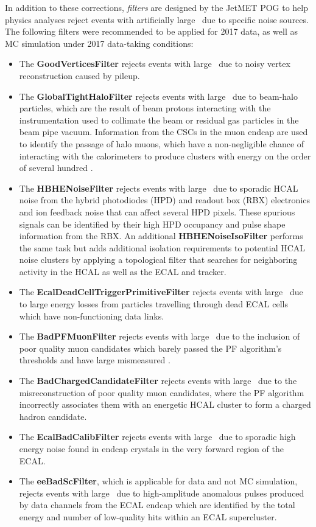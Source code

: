 In addition to these corrections, \textit{filters} are designed by the JetMET POG to help physics analyses reject events with artificially large \pTmiss\ due to specific noise sources. The following filters were recommended to be applied for 2017 data, as well as MC simulation under 2017 data-taking conditions:
\begin{itemize}
  \item The \textbf{GoodVerticesFilter} rejects events with large \pTmiss\ due to noisy vertex reconstruction caused by pileup. 
  \item The \textbf{GlobalTightHaloFilter} rejects events with large \pTmiss\ due to beam-halo particles, which are the result of beam protons interacting with the instrumentation used to collimate the beam or residual gas particles in the beam pipe vacuum. Information from the CSCs in the muon endcap are used to identify the passage of halo muons, which have a non-negligible chance of interacting with the calorimeters to produce clusters with energy on the order of several hundred \GeV.
  \item The \textbf{HBHENoiseFilter} rejects events with large \pTmiss\ due to sporadic HCAL noise from the hybrid photodiodes (HPD) and readout box (RBX) electronics and ion feedback noise that can affect several HPD pixels. These spurious signals can be identified by their high HPD occupancy and pulse shape information from the RBX. An additional \textbf{HBHENoiseIsoFilter} performs the same task but adds additional isolation requirements to potential HCAL noise clusters by applying a topological filter that searches for neighboring activity in the HCAL as well as the ECAL and tracker.
  \item The \textbf{EcalDeadCellTriggerPrimitiveFilter} rejects events with large \pTmiss\ due to large energy losses from particles travelling through dead ECAL cells which have non-functioning data links.
  \item The \textbf{BadPFMuonFilter} rejects events with large \pTmiss\ due to the inclusion of poor quality muon candidates which barely passed the PF algorithm's thresholds and have large mismeasured \pT.
  \item The \textbf{BadChargedCandidateFilter} rejects events with large \pTmiss\ due to the misreconstruction of poor quality muon candidates, where the PF algorithm incorrectly associates them with an energetic HCAL cluster to form a charged hadron candidate.
  \item The \textbf{EcalBadCalibFilter} rejects events with large \pTmiss\ due to sporadic high energy noise found in endcap crystals in the very forward region of the ECAL.
  \item The \textbf{eeBadScFilter}, which is applicable for data and not MC simulation, rejects events with large \pTmiss\ due to high-amplitude anomalous pulses produced by data channels from the ECAL endcap which are identified by the total energy and number of low-quality hits within an ECAL supercluster.
\end{itemize}
